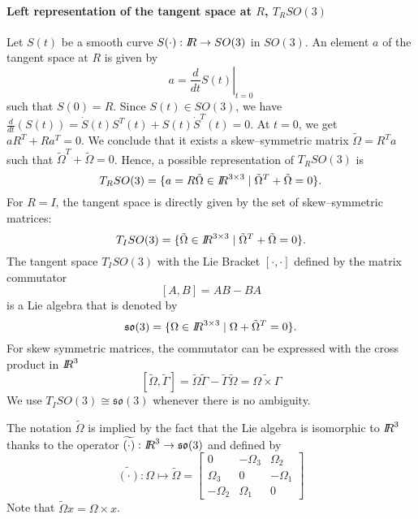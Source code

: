 \paragraph{Left representation of  the tangent space at $R$, $T_RSO(3)$ } Let $S(t)$ be a smooth curve $S(\cdot) : \mbox{\rm $I\!\!R$}  \rightarrow SO(3)$ in $SO(3)$. An element $a$ of the tangent space at $R$ is given by 
\begin{equation}
  \label{eq:174}
  a  = \left.\frac{d}{dt} S(t)\right|_{t=0}
\end{equation}
such that $S(0)= R$.
Since $S(t)\in SO(3)$, we have  $\frac{d}{dt} (S(t)) = \dot S(t)S^T(t) +  S(t) \dot S^T(t) =0$. At $t=0$, we get $a R^T +  R a^T =0$.
We conclude that it exists a skew--symmetric matrix $\tilde \Omega = R^T a$ such that $\tilde \Omega^T + \tilde \Omega =0$. Hence, a possible representation of  $T_RSO(3)$ is
\begin{equation}
  \label{eq:49}
  T_RSO(3) = \{ a = R \tilde \Omega \in \mbox{\rm $I\!\!R$}^{3\times 3} \mid \tilde \Omega^T + \tilde \Omega =0 \}.
\end{equation}
For $R=I$, the tangent space is directly given by the set of  skew--symmetric matrices:
\begin{equation}
  \label{eq:50}
  T_ISO(3) = \{ \tilde \Omega\in \mbox{\rm $I\!\!R$}^{3\times 3} \mid \tilde \Omega^T + \tilde \Omega =0 \}.
\end{equation}
The tangent space $T_ISO(3)$ with the Lie Bracket $[\cdot,\cdot]$ defined by the matrix commutator
\begin{equation}
  \label{eq:51}
  [A,B] = AB-BA
\end{equation}
is a Lie algebra that is denoted by
\begin{equation}
  \label{eq:53}
  \mathfrak{so}(3) =\{\Omega\in \mbox{\rm $I\!\!R$}^{3\times 3} \mid \Omega + \tilde \Omega^T =0\}.
\end{equation}
 For skew symmetric matrices, the commutator can be expressed with the cross product in $\mbox{\rm $I\!\!R$}^3$
\begin{equation}
  \label{eq:52}
  [\tilde \Omega, \tilde \Gamma] = \tilde \Omega \tilde \Gamma - \tilde \Gamma \tilde \Omega= \widetilde{\Omega \times \Gamma }
\end{equation}
We use   $T_ISO(3) \cong  \mathfrak{so}(3)$ whenever there is no ambiguity.

The notation $\tilde \Omega$ is implied by the fact that the Lie algebra is isomorphic to $\mbox{\rm $I\!\!R$}^3$ thanks to the operator $\widetilde{(\cdot)} :\mbox{\rm $I\!\!R$}^3 \rightarrow \mathfrak{so}(3)$ and defined by
\begin{equation}
  \label{eq:54}
 \widetilde{(\cdot)}: \Omega \mapsto \tilde \Omega =
  \begin{bmatrix}
    0 & -\Omega_3 & \Omega_2 \\
    \Omega_3 & 0 & -\Omega_1 \\
    -\Omega_2  & \Omega_1 & 0
  \end{bmatrix}
\end{equation}
Note that $\tilde \Omega x = \Omega \times x$.

